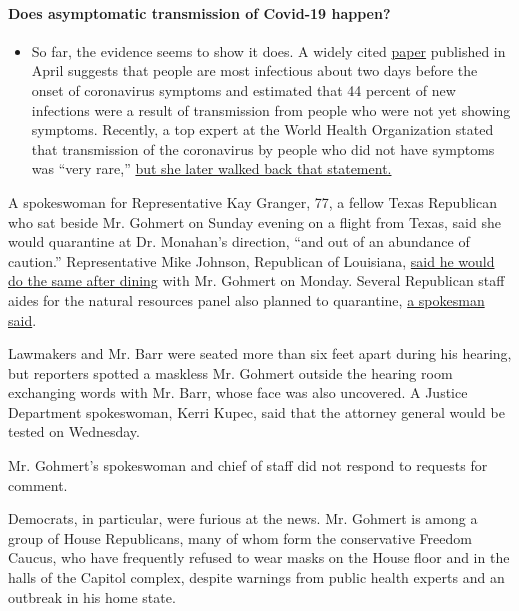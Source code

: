 \begin{itemize}
{  \paragraph{Does asymptomatic transmission of Covid-19
  happen?}\label{does-asymptomatic-transmission-of-covid-19-happen}}

  \begin{itemize}
  \tightlist
  \item
    So far, the evidence seems to show it does. A widely cited
    \href{https://www.nature.com/articles/s41591-020-0869-5}{paper}
    published in April suggests that people are most infectious about
    two days before the onset of coronavirus symptoms and estimated that
    44 percent of new infections were a result of transmission from
    people who were not yet showing symptoms. Recently, a top expert at
    the World Health Organization stated that transmission of the
    coronavirus by people who did not have symptoms was ``very rare,''
    \href{https://www.nytimes3xbfgragh.onion/2020/06/09/world/coronavirus-updates.html?action=click\&pgtype=Article\&state=default\&region=MAIN_CONTENT_3\&context=storylines_faq\#link-1f302e21}{but
    she later walked back that statement.}
  \end{itemize}
\end{itemize}

A spokeswoman for Representative Kay Granger, 77, a fellow Texas
Republican who sat beside Mr. Gohmert on Sunday evening on a flight from
Texas, said she would quarantine at Dr. Monahan's direction, ``and out
of an abundance of caution.'' Representative Mike Johnson, Republican of
Louisiana,
\href{https://twitter.com/RepMikeJohnson/status/1288655872953024512?s=20}{said
he would do the same after dining} with Mr. Gohmert on Monday. Several
Republican staff aides for the natural resources panel also planned to
quarantine,
\href{https://twitter.com/CapitolHacker/status/1288590480121487360?s=20}{a
spokesman said}.

Lawmakers and Mr. Barr were seated more than six feet apart during his
hearing, but reporters spotted a maskless Mr. Gohmert outside the
hearing room exchanging words with Mr. Barr, whose face was also
uncovered. A Justice Department spokeswoman, Kerri Kupec, said that the
attorney general would be tested on Wednesday.

Mr. Gohmert's spokeswoman and chief of staff did not respond to requests
for comment.

Democrats, in particular, were furious at the news. Mr. Gohmert is among
a group of House Republicans, many of whom form the conservative Freedom
Caucus, who have frequently refused to wear masks on the House floor and
in the halls of the Capitol complex, despite warnings from public health
experts and an outbreak in his home state.

